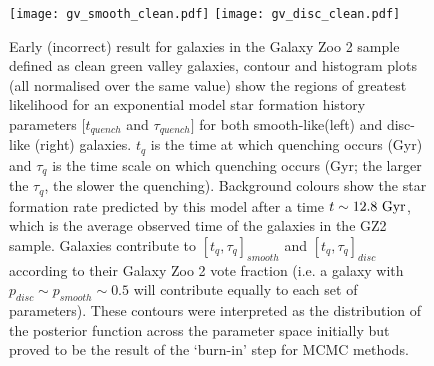 \documentclass{mn2e}
\begin{document}
%
\begin{figure}
\texttt{[image: gv\_smooth\_clean.pdf]}
\texttt{[image: gv\_disc\_clean.pdf]}
\caption{Early (incorrect) result for galaxies in the Galaxy Zoo 2 sample defined as clean green valley galaxies, contour and histogram plots (all normalised over the same value) show the regions of greatest likelihood for an exponential model star formation history parameters $[t_{quench}$ and $\tau_{quench}]$ for both smooth-like(left) and disc-like (right) galaxies. $t_{q}$ is the time at which quenching occurs (Gyr) and $\tau_{q}$ is the time scale on which quenching occurs (Gyr; the larger the $\tau_{q}$, the slower the quenching). Background colours show the star formation rate predicted by this model after a time $t \sim 12.8~\rm{Gyr}$, which is the average observed time of the galaxies in the GZ2 sample. Galaxies contribute  to $[t_{q}, \tau_{q}]_{smooth}$ and $[t_{q}, \tau_{q}]_{disc}$ according to their Galaxy Zoo 2 vote fraction (i.e. a galaxy with $p_{disc} \sim p_{smooth} \sim 0.5$ will contribute equally to each set of parameters). These contours were interpreted as the distribution of the posterior function across the parameter space initially but proved to be the result of the `burn-in' step for MCMC methods.}
\label{gv_clean}
\end{figure}
\end{document}
